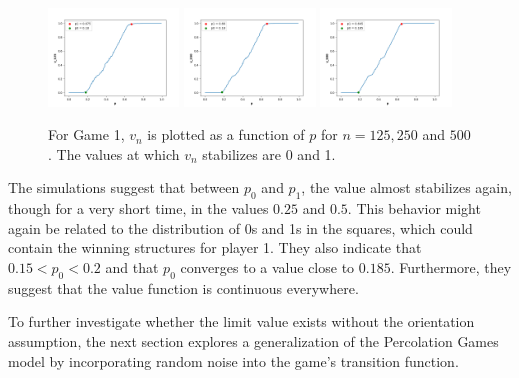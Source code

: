         \begin{figure}[!hbt]
            \centering
            \includegraphics[width = 0.31\textwidth]{./images/game1/0pN125MAXITER30EPS0.01.png}        
            \includegraphics[width = 0.31\textwidth]{./images/game1/0pN250MAXITER30EPS0.01.png}        
            \includegraphics[width = 0.31\textwidth]{./images/game1/0pN500MAXITER30EPS0.01.png}
            \caption{For Game 1, $v_{n}$ is plotted as a function of $p$ for $n = 125, 250$ and $500$. The values at which $v_{n}$ stabilizes are 0 and 1.} 
            \label{figurepNgame1}
        \end{figure} 

        The simulations suggest that between $p_0$ and $p_1$, the value almost stabilizes again, though for a very short time, in the values $0.25$ and $0.5$. This behavior might again be related to the distribution of 0s and 1s in the squares, which could contain the winning structures for player 1. They also indicate that $0.15 < p_0 < 0.2$ and that $p_0$ converges to a value close to $0.185$. Furthermore, they suggest that the value function is continuous everywhere.

        To further investigate whether the limit value exists without the orientation assumption, the next section explores a generalization of the Percolation Games model by incorporating random noise into the game's transition function.
